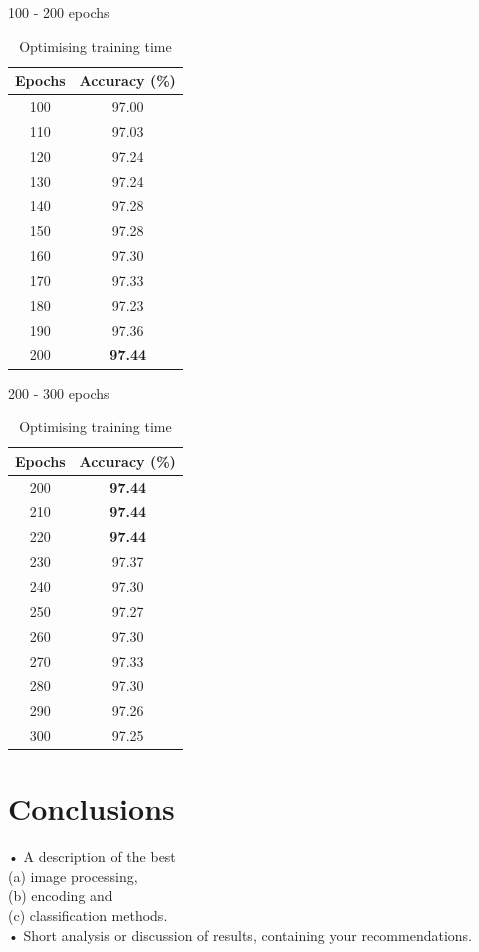 \documentclass[12pt]{article}
\begin{document}
    \begin{table}[H]
      \begin{subtable}{.5\linewidth}
        \centering
        \caption{100 - 200 epochs}
        \begin{tabular}{c|c}
          \toprule
          Epochs & Accuracy (\%) \\
          \midrule
          100   & 97.00 \\
          110   & 97.03 \\
          120   & 97.24 \\
          130   & 97.24 \\
          140   & 97.28 \\
          150   & 97.28 \\
          160   & 97.30 \\
          170   & 97.33 \\
          180   & 97.23 \\
          190   & 97.36 \\
          200   & \textbf{97.44} \\
          \bottomrule
        \end{tabular}%
        \label{tab:mlp-tt-1}%
      \end{subtable}
      \begin{subtable}{.5\linewidth}
        \centering
        \caption{200 - 300 epochs}
        \begin{tabular}{c|c}
          \toprule
          Epochs & Accuracy (\%) \\
          \midrule
          200   & \textbf{97.44} \\
          210   & \textbf{97.44} \\
          220   & \textbf{97.44} \\
          230   & 97.37 \\
          240   & 97.30 \\
          250   & 97.27 \\
          260   & 97.30 \\
          270   & 97.33 \\
          280   & 97.30 \\
          290   & 97.26 \\
          300   & 97.25 \\
          \bottomrule
        \end{tabular}%
        \label{tab:mlp-tt-2}%
      \end{subtable}
      \caption{Optimising training time}
      \label{tab:mlp-tt}
    \end{table}%

\section{Conclusions}
• A description of the best\\
(a) image processing,\\
(b) encoding and\\
(c) classification methods.\\
• Short analysis or discussion of results, containing your recommendations.

\newpage



\end{document}
